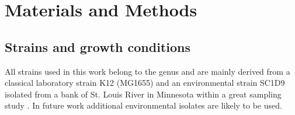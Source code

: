 \chapter{Materials and Methods}

\shorthandoff{-} 

\section{Strains and growth conditions}
All strains used in this work belong to the genus  and are mainly derived from a classical laboratory strain K12 (MG1655) and an environmental strain SC1\textunderscore D9 isolated from a bank of St. Louis River in Minnesota within a great sampling study \cite{ishii2006presence}.
In future work additional environmental isolates are likely to be used.

